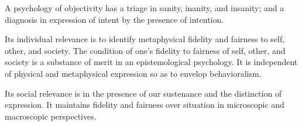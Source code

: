 

A psychology of objectivity has a triage in sanity, inanity, and
insanity; and a diagnosis in expression of intent by the presence of
intention.

Its individual relevance is to identify metaphysical fidelity and
fairness to self, other, and society.  The condition of one's fidelity
to fairness of self, other, and society is a substance of merit in an
epistemological psychology.  It is independent of physical and
metaphysical expression so as to envelop behavioralism.

Its social relevance is in the presence of our sustenance and the
distinction of expression.  It maintains fidelity and fairness over
situation in microscopic and macroscopic perspectives.

\bye
